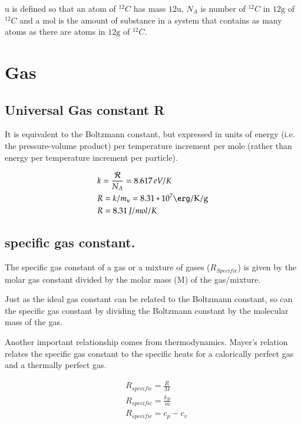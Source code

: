 \documentclass[main.tex]{subfiles}
\begin{document}
\si{\atomicmassunit} is defined so that an atom of $^{12}C$ has mass $12 \si{\atomicmassunit}$, $N_A$ is number of $^{12}C$ in $12 \si{\gram}$ of $^{12}C$ and a \si{\mole} is the amount of substance in a system that contains as many atoms as there are atoms in $12\si{\gram}$ of $^{12}C$.



\section{Gas}

\subsection{Universal Gas constant R}

It is equivalent to the Boltzmann constant, but expressed in units of energy (i.e. the pressure-volume product) per temperature increment per mole (rather than energy per temperature increment per particle).

\begin{align*}
&k=\frac{\gasconstant{}}{N_A}=8.617\,eV/K\\
&R=k/m_u=8.31*10^7 \si{\erg\per\kelvin\per\gram}\\
&R=8.31\,J/mol/K
\end{align*}

\subsection{specific gas constant.}

The specific gas constant of a gas or a mixture of gases ($R_{Specific}$) is given by the molar gas constant divided by the molar mass (M) of the gas/mixture.

Just as the ideal gas constant can be related to the Boltzmann constant, so can the specific gas constant by dividing the Boltzmann constant by the molecular mass of the gas.

Another important relationship comes from thermodynamics. Mayer's relation relates the specific gas constant to the specific heats for a calorically perfect gas and a thermally perfect gas.

\begin{align*}
&R_{specific} = \frac{R}{M}\\
&R_{specific} = \frac{{k_{B}}}{m}\\
&R_{specific} = c_p - c_v
\end{align*}
\end{document}

